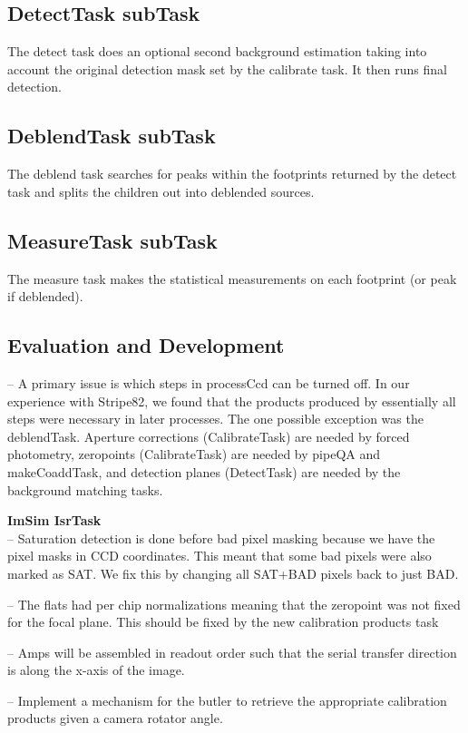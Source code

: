 \documentclass[12pt]{article}
\begin{document}
\subsection{DetectTask subTask}
The detect task does an optional second background estimation taking into account the original detection mask set by the calibrate task.
It then runs final detection.

\subsection{DeblendTask subTask}
The deblend task searches for peaks within the footprints returned by the detect task and splits the children out into deblended sources.

\subsection{MeasureTask subTask}
The measure task makes the statistical measurements on each footprint (or peak if deblended).

\subsection{Evaluation and Development}

-- A primary issue is which steps in processCcd can be turned off.  In our experience with Stripe82, we found that the products produced by
essentially all steps were necessary in later processes.  The one possible exception was the deblendTask.  Aperture corrections (CalibrateTask) 
are needed by forced photometry, zeropoints (CalibrateTask)
are needed by pipeQA and makeCoaddTask, and detection planes (DetectTask) are needed by the background matching tasks.

{\bf ImSim IsrTask}\\
-- Saturation detection is done before bad pixel masking because we have the pixel masks in CCD coordinates.
This meant that some bad pixels were also marked as SAT.  We fix this by changing all SAT+BAD pixels back to just BAD.

-- The flats had per chip normalizations meaning that the zeropoint was not fixed for the focal plane.  This should be
fixed by the new calibration products task

-- Amps will be assembled in readout order such that the serial transfer direction is along the x-axis of the image.

-- Implement a mechanism for the butler to retrieve the appropriate calibration products given a camera rotator angle.
\end{document}

